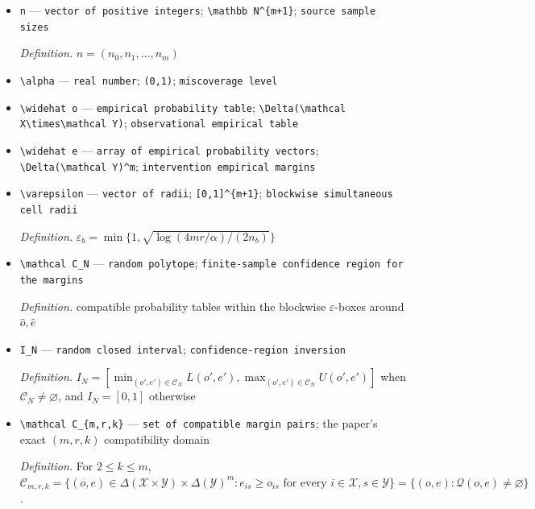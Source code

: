 \documentclass{article}
\begin{document}
\begin{itemize}
  \item \texttt{n} --- \texttt{vector of positive integers}; \texttt{\textbackslash{}\allowbreak{}mathbb N\textasciicircum{}\{m+\allowbreak{}1\}\allowbreak{}}; \texttt{source sample sizes}
  \par\smallskip\noindent\emph{Definition.} \(n=(n_0,n_1,\ldots,n_m)\)
  \item \texttt{\textbackslash{}\allowbreak{}alpha} --- \texttt{real number}; \texttt{(0,\allowbreak{}1)}; \texttt{miscoverage level}
  \item \texttt{\textbackslash{}\allowbreak{}widehat o} --- \texttt{empirical probability table}; \texttt{\textbackslash{}\allowbreak{}Delta(\textbackslash{}\allowbreak{}mathcal X\textbackslash{}\allowbreak{}times\textbackslash{}\allowbreak{}mathcal Y)}; \texttt{observational empirical table}
  \item \texttt{\textbackslash{}\allowbreak{}widehat e} --- \texttt{array of empirical probability vectors}; \texttt{\textbackslash{}\allowbreak{}Delta(\textbackslash{}\allowbreak{}mathcal Y)\textasciicircum{}m}; \texttt{intervention empirical margins}
  \item \texttt{\textbackslash{}\allowbreak{}varepsilon} --- \texttt{vector of radii}; \texttt{[0,\allowbreak{}1]\textasciicircum{}\{m+\allowbreak{}1\}\allowbreak{}}; \texttt{blockwise simultaneous cell radii}
  \par\smallskip\noindent\emph{Definition.} \(\varepsilon_b=\min\{1,\sqrt{\log(4mr/\alpha)/(2n_b)}\}\)
  \item \texttt{\textbackslash{}\allowbreak{}mathcal C\_\allowbreak{}N} --- \texttt{random polytope}; \texttt{finite-\allowbreak{}sample confidence region for the margins}
  \par\smallskip\noindent\emph{Definition.} compatible probability tables within the blockwise \(\varepsilon\)-boxes around \(\widehat o,\widehat e\)
  \item \texttt{I\_\allowbreak{}N} --- \texttt{random closed interval}; \texttt{confidence-\allowbreak{}region inversion}
  \par\smallskip\noindent\emph{Definition.} \(I_N=[\min_{(o',e')\in\mathcal C_N}L(o',e'),\max_{(o',e')\in\mathcal C_N}U(o',e')]\) when \(\mathcal C_N\neq\varnothing\), and \(I_N=[0,1]\) otherwise
  \item \texttt{\textbackslash{}\allowbreak{}mathcal C\_\allowbreak{}\{m,\allowbreak{}r,\allowbreak{}k\}\allowbreak{}} --- \texttt{set of compatible margin pairs}; the paper's exact \((m,r,k)\) compatibility domain
  \par\smallskip\noindent\emph{Definition.} For \(2\leq k\leq m\), \(\mathcal C_{m,r,k}=\{(o,e)\in\Delta(\mathcal X\times\mathcal Y)\times\Delta(\mathcal Y)^m:e_{is}\geq o_{is}\text{ for every }i\in\mathcal X,s\in\mathcal Y\}=\{(o,e):\mathcal Q(o,e)\neq\varnothing\}\).

\end{itemize}
\end{document}
